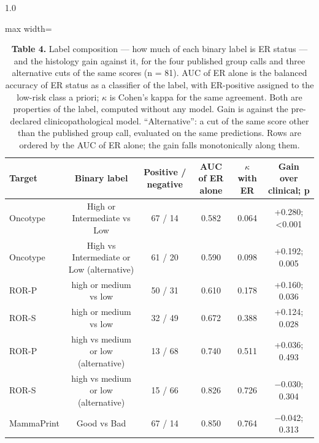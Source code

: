 \documentclass[11pt,a4paper]{article}
\begin{document}
\begin{spacing}{1.0}
\begin{table}[htbp]\centering\footnotesize
\caption*{\textbf{Table 4.} Label composition --- how much of each binary label is ER status --- and the histology gain against it, for the four published group calls and three alternative cuts of the same scores (n = 81). AUC of ER alone is the balanced accuracy of ER status as a classifier of the label, with ER-positive assigned to the low-risk class a priori; $\kappa$ is Cohen's kappa for the same agreement. Both are properties of the label, computed without any model. Gain is against the pre-declared clinicopathological model. ``Alternative'': a cut of the same score other than the published group call, evaluated on the same predictions. Rows are ordered by the AUC of ER alone; the gain falls monotonically along them.}
\begin{adjustbox}{max width=\textwidth}
\begin{tabular}{@{}lccccc@{}}
\toprule
\textbf{Target} & \textbf{Binary label} & \textbf{Positive / negative} & \textbf{AUC of ER alone} & \textbf{$\kappa$ with ER} & \textbf{Gain over clinical; p} \\
\midrule
Oncotype & High or Intermediate vs Low & 67 / 14 & 0.582 & 0.064 & +0.280; <0.001 \\
Oncotype & High vs Intermediate or Low (alternative) & 61 / 20 & 0.590 & 0.098 & +0.192; 0.005 \\
ROR-P & high or medium vs low & 50 / 31 & 0.610 & 0.178 & +0.160; 0.036 \\
ROR-S & high or medium vs low & 32 / 49 & 0.672 & 0.388 & +0.124; 0.028 \\
ROR-P & high vs medium or low (alternative) & 13 / 68 & 0.740 & 0.511 & +0.036; 0.493 \\
ROR-S & high vs medium or low (alternative) & 15 / 66 & 0.826 & 0.726 & $-$0.030; 0.304 \\
MammaPrint & Good vs Bad & 67 / 14 & 0.850 & 0.764 & $-$0.042; 0.313 \\
\bottomrule
\end{tabular}
\end{adjustbox}\end{table}

\end{spacing}
\clearpage
\end{document}
